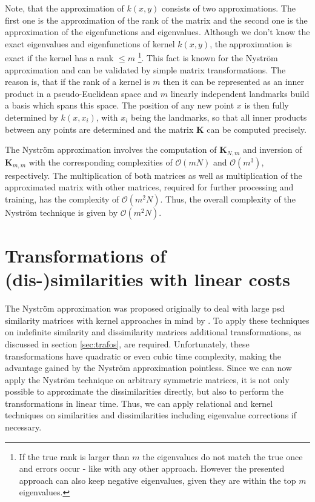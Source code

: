 \documentclass[twoside,11pt]{article}
\begin{document}
Note, that the approximation of $k(x,y)$ consists of two approximations.
The first one is the approximation of the rank of the matrix and the second one
is the approximation of the eigenfunctions and eigenvalues.
Although we don't know the exact eigenvalues and eigenfunctions
of kernel $k(x,y)$, the approximation is exact if the kernel has a rank $\le m$
\footnote{If the true rank is larger than $m$ the eigenvalues do not match the 
true once and errors occur - like with any other approach. However the presented
approach can also keep negative eigenvalues, given they are within the top $m$ eigenvalues.}.
This fact is known for the Nystr\"om approximation and can be validated
by simple matrix transformations. The reason is, that if the rank of a kernel is $m$
then it can be represented as an inner product in a pseudo-Euclidean space
and $m$ linearly independent landmarks build a basis which spans this space.
The position of any new point $x$ is then fully determined by $k(x,x_i)$,
with $x_i$ being the landmarks, so that all inner products between any points
are determined and the matrix $\mathbf{K}$ can be computed precisely.

The Nystr\"om approximation involves the computation of $\mathbf{K}_{N,m}$
and inversion of $\mathbf{K}_{m,m}$ with the corresponding complexities of
$\mathcal{O}(mN)$ and $\mathcal{O}(m^3)$, respectively.
The multiplication of both matrices as well as multiplication
of the approximated matrix with other matrices,
required for further processing and training,
has the complexity of $\mathcal{O}(m^2 N)$.
Thus, the overall complexity of the Nystr\"om technique
is given by $\mathcal{O}(m^2N)$.

\section{Transformations of (dis-)similarities with linear costs}
The Nystr\"om approximation was proposed originally
to deal with large psd similarity matrices
with kernel approaches in mind by \cite{DBLP:conf/nips/WilliamsS00}.
To apply these techniques on indefinite similarity and dissimilarity matrices
additional transformations, as discussed in section \ref{sec:trafos}, are required.
Unfortunately, these transformations have quadratic or even cubic time complexity,
making the advantage gained by the Nystr\"om approximation pointless.
Since we can now apply the Nystr\"om technique on arbitrary symmetric matrices,
it is not only possible to approximate the dissimilarities directly,
but also to perform the transformations in linear time.
Thus, we can apply relational and kernel techniques
on similarities and dissimilarities including eigenvalue corrections if necessary.
\end{document}
